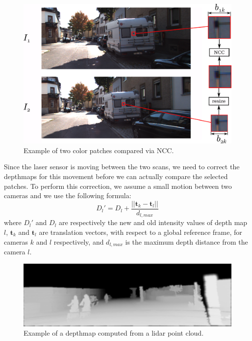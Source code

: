 \begin{figure}[t]
\centering
\includegraphics[width=0.98\columnwidth]{./img/ch-laser/ncc}
\caption{Example of two color patches compared via NCC.}
\label{fig:ncc}
\end{figure}

Since the laser sensor is moving between the two scans, we need to correct the depthmaps for this movement before we can actually compare the selected patches.
To perform this correction, we assume a small motion between two cameras and we use the following formula:
\begin{equation}
D_l' = D_l + \frac{||\mathbf{t}_k - \mathbf{t}_l||}{d_{l,max}}
\end{equation}
where $D_l'$ and $D_l$ are respectively the new and old intensity values of depth map $l$, $\mathbf{t}_k$ and $\mathbf{t}_l$ are translation vectors, with respect to a global reference frame, for cameras $k$ and $l$ respectively, and $d_{l,max}$ is the maximum depth distance from the camera $l$.

\begin{figure}[t]
\centering
\includegraphics[width=0.98\columnwidth]{./img/ch-laser/depth-0129}
\caption{Example of a depthmap computed from a lidar point cloud.}
\label{fig:depth}
\end{figure}

